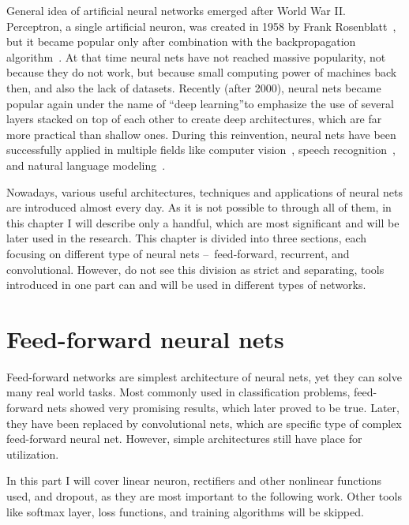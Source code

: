 General idea of artificial neural networks emerged after World War II. Perceptron, a single artificial neuron, was created in 1958 by Frank Rosenblatt~\cite{rosenblatt58a}, but it became popular only after combination with the backpropagation algorithm~\cite{bryson1975applied,werbos1974beyond}. At that time neural nets have not reached massive popularity, not because they do not work, but because small computing power of machines back then, and also the lack of datasets. Recently (after 2000), neural nets became popular again under the name of \textquotedblleft deep learning\textquotedblright to emphasize the use of several layers stacked on top of each other to create deep architectures, which are far more practical than shallow ones. During this reinvention, neural nets have been successfully applied in multiple fields like computer vision~\cite{DBLP:journals/corr/HeZRS15}, speech recognition~\cite{DBLP:journals/corr/abs-1303-5778}, and natural language modeling~\cite{DBLP:conf/interspeech/MikolovKBCK10}.

Nowadays, various useful architectures, techniques and applications of neural nets are introduced almost every day. As it is not possible to through all of them, in this chapter I will describe only a handful, which are most significant and will be later used in the research. This chapter is divided into three sections, each focusing on different type of neural nets --~feed-forward, recurrent, and convolutional. However, do not see this division as strict and separating, tools introduced in one part can and will be used in different types of networks.

\section{Feed-forward neural nets}

Feed-forward networks are simplest architecture of neural nets, yet they can solve many real world tasks. Most commonly used in classification problems, feed-forward nets showed very promising results, which later proved to be true. Later, they have been replaced by convolutional nets, which are specific type of complex feed-forward neural net. However, simple architectures still have place for utilization.

In this part I will cover linear neuron, rectifiers and other nonlinear functions used, and dropout, as they are most important to the following work. Other tools like softmax layer, loss functions, and training algorithms will be skipped.


